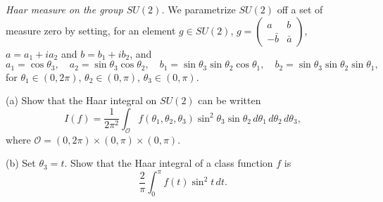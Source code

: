 \begin{exercise}
\emph{Haar measure on the group $SU(2)$.}
We parametrize $SU(2)$ off a set of measure zero by setting, for an element
$g\in SU(2)$, $g=\begin{pmatrix}a&b\\-\bar b&\bar a\end{pmatrix}$,
$a=a_1+ia_2$ and $b=b_1+ib_2$, and
\[
 a_1=\cos\theta_3,\quad a_2=\sin\theta_3\cos\theta_2,\quad
 b_1=\sin\theta_3\sin\theta_2\cos\theta_1,\quad
 b_2=\sin\theta_3\sin\theta_2\sin\theta_1,
\]
for $\theta_1\in(0,2\pi)$, $\theta_2\in(0,\pi)$, $\theta_3\in(0,\pi)$.

(a) Show that the Haar integral on $SU(2)$ can be written
\[
 I(f)=\frac{1}{2\pi^2}\int_{\mathcal O}f(\theta_1,\theta_2,\theta_3)
 \sin^2\theta_3\sin\theta_2\,d\theta_1\,d\theta_2\,d\theta_3,
\]
where $\mathcal O=(0,2\pi)\times(0,\pi)\times(0,\pi)$.

(b) Set $\theta_3=t$. Show that the Haar integral of a class function $f$ is
\[
 \frac{2}{\pi}\int_0^\pi f(t)\sin^2t\,dt.
\]
\end{exercise}
